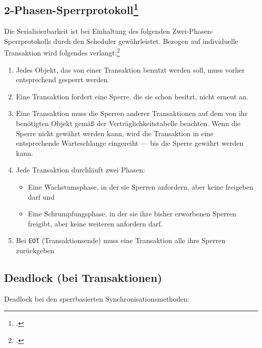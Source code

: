 \documentclass{lehramt-informatik}
\begin{document}
%

\subsection{2-Phasen-Sperrprotokoll\footcite[Seite 16]{db:fs:5}}

Die Serialisierbarkeit ist bei Einhaltung des folgenden
Zwei-Phasen-Sperrprotokolls durch den Scheduler gewährleistet. Bezogen
auf individuelle Transaktion wird folgendes verlangt:\footcite{wiki:sperrverfahren}

\begin{enumerate}
\item Jedes Objekt, das von einer Transaktion benutzt werden soll, muss
vorher entsprechend gesperrt werden.

\item Eine Transaktion fordert eine Sperre, die sie schon besitzt, nicht
erneut an.

\item Eine Transaktion muss die Sperren anderer Transaktionen auf dem
von ihr benötigten Objekt gemäß der Verträglichkeitstabelle beachten.
Wenn die Sperre nicht gewährt werden kann, wird die Transaktion in eine
entsprechende Warteschlange eingereiht — bis die Sperre gewährt werden
kann.

\item Jede Transaktion durchläuft zwei Phasen:

\begin{itemize}
\item Eine Wachstumsphase, in der sie Sperren anfordern, aber keine
freigeben darf und

\item Eine Schrumpfungsphase, in der sie ihre bisher erworbenen
Sperren freigibt, aber keine weiteren anfordern darf.
\end{itemize}

\item Bei \texttt{EOT} (Transaktionsende) muss eine Transaktion alle
ihre Sperren zurückgeben
\end{enumerate}

%

\subsection{Deadlock (bei Transaktionen)}

Deadlock bei den sperrbasierten Synchronisationsmethoden:
\end{document}
